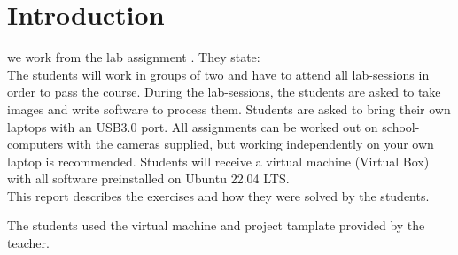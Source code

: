 \section{Introduction}
\label{sec:introduction}

we work from the lab assignment \cite{Lab_Assignments}. They state: \\

The students will work in groups of two and have to attend all lab-sessions in order to pass the course.
During the lab-sessions, the students are asked to take images and write software to process them.
Students are asked to bring their own laptops with an USB3.0 port. All assignments can be worked out on school-computers with the cameras supplied, but working independently on your own laptop is recommended. Students will receive a virtual machine (Virtual Box) with all software preinstalled on Ubuntu 22.04 LTS. \\

This report describes the exercises and how they were solved by the students.

The students used the virtual machine and project tamplate provided by the teacher.